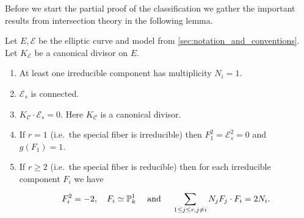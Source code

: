 Before we start the partial proof of the classification we gather the important results from intersection theory in the following lemma. 
\begin{lemma}
	\label{prop:irred_comp_of_prop_model}
	Let $E, \mathscr E$ be the elliptic curve and model from \cref{sec:notation_and_conventions}. 
	Let $K_{\mathscr E}$ be a canonical divisor on $E$. 
	\begin{enumerate}
		\item At least one irreducible component has multiplicity $N_i = 1$.  
		\item $\mathscr E_s$ is connected. 
		\item $K_{\mathcal{C} } \cdot \mathscr E_s = 0 $. 
			Here $K_{\mathcal{C} }$ is a canonical divisor. 
		\item If $r = 1$ (i.e.\ the special fiber is irreducible) then $F_1^2 = \mathscr{E} _s^2 = 0$ and $g (F_1) = 1$. 
		\item If $r \ge 2$ (i.e.\ the special fiber is reducible) then for each irreducible component $F_i$ we have \[
		F_i^2 = -2,\quad  F_i \simeq \mathbb{P}^{1}_k \quad \text{ and }\quad \sum_{1 \le j \le r, j \ne i}^{} N_j F_j\cdot  F_i = 2 N_i
		.\]   
	\end{enumerate}
\end{lemma}
